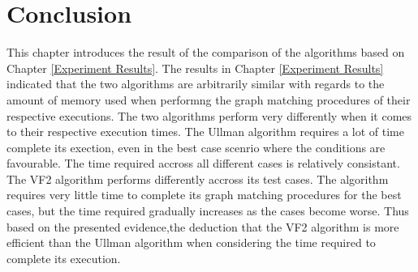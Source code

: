\section{Conclusion}
\label{Conclusion}
This chapter introduces the result of the comparison of the algorithms based on Chapter \ref{Experiment Results}. The results in Chapter \ref{Experiment Results} 
indicated that the two algorithms are arbitrarily similar with regards to the amount of memory used when performng the graph matching procedures of their
respective executions.\newline\newline
The two algorithms perform very differently when it comes to their respective execution times. The Ullman algorithm requires a lot of time complete its 
exection, even in the best case scenrio where the conditions are favourable. The time required accross all different cases is relatively consistant.\newline
The VF2 algorithm performs differently accross its test cases. The algorithm requires very little time to complete its graph matching procedures for the 
best cases, but the time required gradually increases as the cases become worse. Thus based on the presented evidence,the deduction that the VF2 algorithm 
is more efficient than the Ullman algorithm when considering the time required to complete its execution.
\newpage